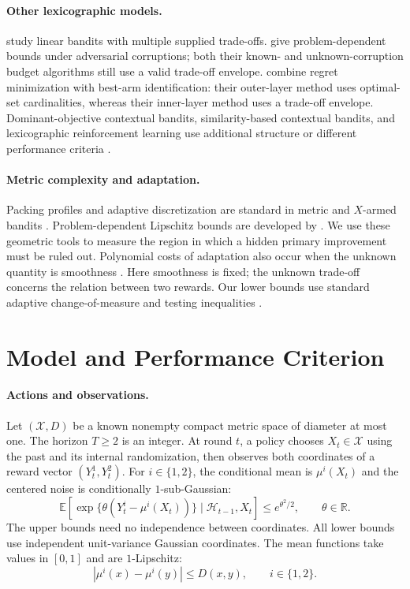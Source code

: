 \documentclass[11pt]{article}
\theoremstyle{definition}
\newcommand{\X}{\mathcal X}
\newcommand{\E}{\mathbb E}
\newcommand{\R}{\mathbb R}
\begin{document}
\paragraph{Other lexicographic models.}
\citet{xue2025linear} study linear bandits with multiple supplied
trade-offs. \citet{xue2025corruptions} give problem-dependent bounds
under adversarial corruptions; both their known- and unknown-corruption
budget algorithms still use a valid trade-off envelope.
\citet{xue2026lexelim} combine regret minimization with best-arm
identification: their outer-layer method uses optimal-set cardinalities,
whereas their inner-layer method uses a trade-off envelope.
Dominant-objective contextual bandits, similarity-based contextual
bandits, and lexicographic reinforcement learning use additional
structure or different performance criteria
\citep{tekin2018dominant,turgay2018similarity,skalse2022lexicographic}.

\paragraph{Metric complexity and adaptation.}
Packing profiles and adaptive discretization are standard in metric
and $X$-armed bandits
\citep{kleinberg2008metric,bubeck2011xarmed,slivkins2011implicit}.
Problem-dependent Lipschitz bounds are developed by
\citet{magureanu2014lipschitz}. We use these geometric tools to measure
the region in which a hidden primary improvement must be ruled out.
Polynomial costs of adaptation also occur when the unknown quantity
is smoothness \citep{locatelli2018adaptivity,hadiji2019polynomial}.
Here smoothness is fixed; the unknown trade-off concerns the relation
between two rewards. Our lower bounds use standard adaptive
change-of-measure and testing inequalities
\citep{bubeck2012survey,lattimore2020bandit}.

\section{Model and Performance Criterion}
\label{sec:model}

\paragraph{Actions and observations.}
Let $(\X,D)$ be a known nonempty compact metric space of diameter at
most one. The horizon $T\ge2$ is an integer. At round $t$, a policy
chooses $X_t\in\X$ using the past and its internal randomization, then
observes both coordinates of a reward vector $(Y_t^1,Y_t^2)$.
For $i\in\{1,2\}$, the conditional mean is $\mu^i(X_t)$ and the
centered noise is conditionally $1$-sub-Gaussian:
\[
 \E\!\left[\exp\{\theta(Y_t^i-\mu^i(X_t))\}
       \mid\mathcal H_{t-1},X_t\right]\le e^{\theta^2/2},
 \qquad \theta\in\R.
\]
The upper bounds need no independence between coordinates.
All lower bounds use independent unit-variance Gaussian coordinates.
The mean functions take values in $[0,1]$ and are $1$-Lipschitz:
\[
 |\mu^i(x)-\mu^i(y)|\le D(x,y),\qquad i\in\{1,2\}.
\]
\end{document}
